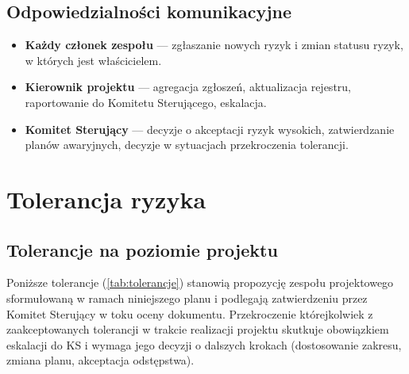 \documentclass[11pt,a4paper]{article}
\begin{document}
	\subsection{Odpowiedzialności komunikacyjne}
	\begin{itemize}[noitemsep]
		\item \textbf{Każdy członek zespołu} --- zgłaszanie nowych ryzyk i zmian statusu ryzyk, w których jest właścicielem.
		\item \textbf{Kierownik projektu} --- agregacja zgłoszeń, aktualizacja rejestru, raportowanie do Komitetu Sterującego, eskalacja.
		\item \textbf{Komitet Sterujący} --- decyzje o akceptacji ryzyk wysokich, zatwierdzanie planów awaryjnych, decyzje w sytuacjach przekroczenia tolerancji.
	\end{itemize}
	
	\section{Tolerancja ryzyka}\label{sec:tolerancja}
	
	\subsection{Tolerancje na poziomie projektu}
	Poniższe tolerancje (\cref{tab:tolerancje}) stanowią propozycję zespołu projektowego sformułowaną w ramach
	niniejszego planu i podlegają zatwierdzeniu przez Komitet Sterujący w toku oceny
	dokumentu. Przekroczenie którejkolwiek z zaakceptowanych tolerancji w trakcie realizacji
	projektu skutkuje obowiązkiem eskalacji do KS i wymaga jego decyzji o dalszych krokach
	(dostosowanie zakresu, zmiana planu, akceptacja odstępstwa).
	
\end{document}
